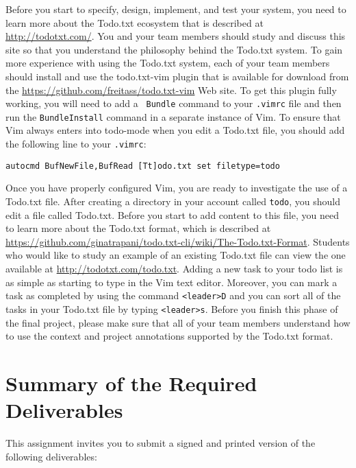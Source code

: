 Before you start to specify, design, implement, and test your system, you need to learn more about the Todo.txt
ecosystem that is described at \url{http://todotxt.com/}. You and your team members should study and discuss this site
so that you understand the philosophy behind the Todo.txt system. To gain more experience with using the Todo.txt
system, each of your team members should install and use the todo.txt-vim plugin that is available for download from the
\url{https://github.com/freitass/todo.txt-vim} Web site. To get this plugin fully working, you will need to add a {\tt
  Bundle} command to your {\tt .vimrc} file and then run the {\tt BundleInstall} command in a separate instance of Vim.
To ensure that Vim always enters into todo-mode when you edit a Todo.txt file, you should add the following line to your
{\tt .vimrc}:

{\tt autocmd BufNewFile,BufRead [Tt]odo.txt set filetype=todo}

Once you have properly configured Vim, you are ready to investigate the use of a Todo.txt file. After creating a
directory in your account called {\tt todo}, you should edit a file called Todo.txt.  Before you start to add content to
this file, you need to learn more about the Todo.txt format, which is described at
\url{https://github.com/ginatrapani/todo.txt-cli/wiki/The-Todo.txt-Format}. Students who would like to study an example
of an existing Todo.txt file can view the one available at \url{http://todotxt.com/todo.txt}. Adding a new task to your
todo list is as simple as starting to type in the Vim text editor.  Moreover, you can mark a task as completed by using
the command {\tt <leader>D} and you can sort all of the tasks in your Todo.txt file by typing {\tt <leader>s}. Before
you finish this phase of the final project, please make sure that all of your team members understand how to use the
context and project annotations supported by the Todo.txt format.

\section*{Summary of the Required Deliverables}

  This assignment invites you to submit a signed and printed version of the following deliverables: 


